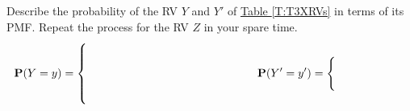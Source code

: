  \begin{classwork}
Describe the probability of the RV $Y$ and $Y'$ of \hyperref[T:T3XRVs]{Table \ref*{T:T3XRVs}} in terms of its PMF.  Repeat the process for the RV $Z$ in your spare time.
 \begin{eqnarray}
 \p(Y=y) =%
 \begin{cases}
 \qquad & \qquad \notag \\
 \qquad & \qquad \notag \\
 \qquad & \qquad \notag \\
 \qquad & \qquad \notag
 \end{cases} 
 & \qquad \qquad \qquad \qquad \qquad
\p(Y'=y') =%
 \begin{cases}
 \qquad & \qquad \notag \\
 \qquad & \qquad \notag 
 \end{cases}
 \end{eqnarray}
 \end{classwork}
 
